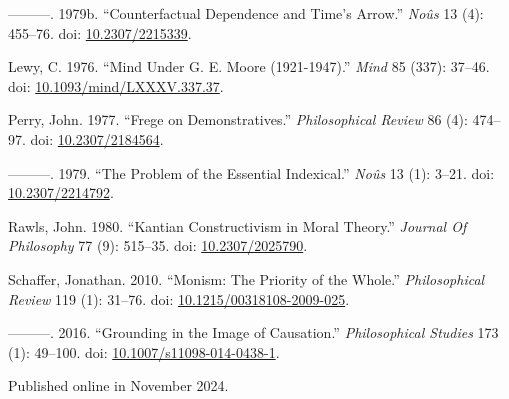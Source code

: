 \documentclass[
  10pt,
  letterpaper,
  DIV=11,
  numbers=noendperiod,
  twoside]{scrartcl}
\newlength{\cslhangindent}
\newenvironment{CSLReferences}[2] %
 {\begin{list}{}{%
  \setlength{\itemindent}{0pt}
  \setlength{\leftmargin}{0pt}
  \setlength{\parsep}{0pt}
  \ifodd #1
   \setlength{\leftmargin}{\cslhangindent}
   \setlength{\itemindent}{-1\cslhangindent}
  \fi
  \setlength{\itemsep}{#2\baselineskip}}}
 {\end{list}}
\begin{document}
\begin{CSLReferences}{1}{0}
---------. 1979b. {``Counterfactual Dependence and Time's Arrow.''}
\emph{No{û}s} 13 (4): 455--76. doi:
\href{https://doi.org/10.2307/2215339}{10.2307/2215339}.

Lewy, C. 1976. {``Mind Under {G. E. Moore} (1921-1947).''} \emph{Mind}
85 (337): 37--46. doi:
\href{https://doi.org/10.1093/mind/LXXXV.337.37}{10.1093/mind/LXXXV.337.37}.

Perry, John. 1977. {``Frege on Demonstratives.''} \emph{Philosophical
Review} 86 (4): 474--97. doi:
\href{https://doi.org/10.2307/2184564}{10.2307/2184564}.

---------. 1979. {``The Problem of the Essential Indexical.''}
\emph{No{û}s} 13 (1): 3--21. doi:
\href{https://doi.org/10.2307/2214792}{10.2307/2214792}.

Rawls, John. 1980. {``Kantian Constructivism in Moral Theory.''}
\emph{Journal Of Philosophy} 77 (9): 515--35. doi:
\href{https://doi.org/10.2307/2025790}{10.2307/2025790}.

Schaffer, Jonathan. 2010. {``Monism: The Priority of the Whole.''}
\emph{Philosophical Review} 119 (1): 31--76. doi:
\href{https://doi.org/10.1215/00318108-2009-025}{10.1215/00318108-2009-025}.

---------. 2016. {``Grounding in the Image of Causation.''}
\emph{Philosophical Studies} 173 (1): 49--100. doi:
\href{https://doi.org/10.1007/s11098-014-0438-1}{10.1007/s11098-014-0438-1}.

\end{CSLReferences}



\noindent Published online in November 2024.
\end{document}
